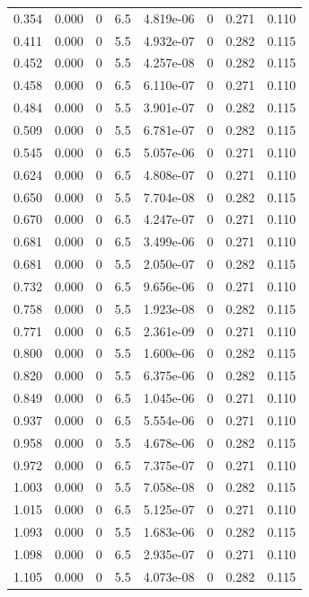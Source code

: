 \documentclass[preview]{standalone}
\begin{document}
{{\begin{tabular}{L{1.2cm}C{1.2cm} C{0.3cm}C{0.5cm} C{1.4cm}C{1.4cm} C{1.4cm}C{1.4cm}}
  0.354  &  0.000  & 0     & 6.5 &  4.819e-06  & 0  & 0.271 &  0.110   \\ 
  0.411  &  0.000  & 0     & 5.5 &  4.932e-07  & 0  & 0.282 &  0.115   \\ 
  0.452  &  0.000  & 0     & 5.5 &  4.257e-08  & 0  & 0.282 &  0.115   \\ 
  0.458  &  0.000  & 0     & 6.5 &  6.110e-07  & 0  & 0.271 &  0.110   \\ 
  0.484  &  0.000  & 0     & 5.5 &  3.901e-07  & 0  & 0.282 &  0.115   \\ 
  0.509  &  0.000  & 0     & 5.5 &  6.781e-07  & 0  & 0.282 &  0.115   \\ 
  0.545  &  0.000  & 0     & 6.5 &  5.057e-06  & 0  & 0.271 &  0.110   \\ 
  0.624  &  0.000  & 0     & 6.5 &  4.808e-07  & 0  & 0.271 &  0.110   \\ 
  0.650  &  0.000  & 0     & 5.5 &  7.704e-08  & 0  & 0.282 &  0.115   \\ 
  0.670  &  0.000  & 0     & 6.5 &  4.247e-07  & 0  & 0.271 &  0.110   \\ 
  0.681  &  0.000  & 0     & 6.5 &  3.499e-06  & 0  & 0.271 &  0.110   \\ 
  0.681  &  0.000  & 0     & 5.5 &  2.050e-07  & 0  & 0.282 &  0.115   \\ 
  0.732  &  0.000  & 0     & 6.5 &  9.656e-06  & 0  & 0.271 &  0.110   \\ 
  0.758  &  0.000  & 0     & 5.5 &  1.923e-08  & 0  & 0.282 &  0.115   \\ 
  0.771  &  0.000  & 0     & 6.5 &  2.361e-09  & 0  & 0.271 &  0.110   \\ 
  0.800  &  0.000  & 0     & 5.5 &  1.600e-06  & 0  & 0.282 &  0.115   \\ 
  0.820  &  0.000  & 0     & 5.5 &  6.375e-06  & 0  & 0.282 &  0.115   \\ 
  0.849  &  0.000  & 0     & 6.5 &  1.045e-06  & 0  & 0.271 &  0.110   \\ 
  0.937  &  0.000  & 0     & 6.5 &  5.554e-06  & 0  & 0.271 &  0.110   \\ 
  0.958  &  0.000  & 0     & 5.5 &  4.678e-06  & 0  & 0.282 &  0.115   \\ 
  0.972  &  0.000  & 0     & 6.5 &  7.375e-07  & 0  & 0.271 &  0.110   \\ 
  1.003  &  0.000  & 0     & 5.5 &  7.058e-08  & 0  & 0.282 &  0.115   \\ 
  1.015  &  0.000  & 0     & 6.5 &  5.125e-07  & 0  & 0.271 &  0.110   \\ 
  1.093  &  0.000  & 0     & 5.5 &  1.683e-06  & 0  & 0.282 &  0.115   \\ 
  1.098  &  0.000  & 0     & 6.5 &  2.935e-07  & 0  & 0.271 &  0.110   \\ 
  1.105  &  0.000  & 0     & 5.5 &  4.073e-08  & 0  & 0.282 &  0.115   \\ 
\hline 
\end{tabular} 

}}
\end{document}
